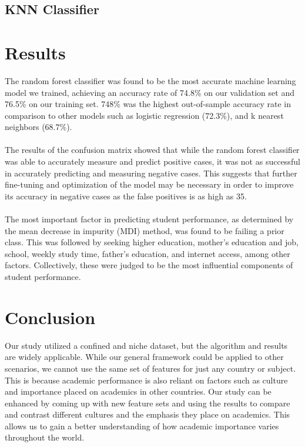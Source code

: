 \documentclass[twoside,twocolumn]{article}
\begin{document}
\subsection{KNN Classifier}

\section{Results}
The random forest classifier was found to be the most accurate machine learning model we trained, achieving an accuracy rate of 74.8\% on our validation set and 76.5\% on our training set. 748\% was the highest out-of-sample accuracy rate in comparison to other models such as logistic regression (72.3\%), and k nearest neighbors (68.7\%).
\\ \\
The results of the confusion matrix showed that while the random forest classifier was able to accurately measure and predict positive cases, it was not as successful in accurately predicting and measuring negative cases. This suggests that further fine-tuning and optimization of the model may be necessary in order to improve its accuracy in negative cases as the false positives is as high as 35.
\\ \\
The most important factor in predicting student performance, as determined by the mean decrease in impurity (MDI) method, was found to be failing a prior class. This was followed by seeking higher education, mother's education and job, school, weekly study time, father's education, and internet access, among other factors. Collectively, these were judged to be the most influential components of student performance.


\section{Conclusion}
Our study utilized a confined and niche dataset, but the algorithm and results are widely applicable. While our general framework could be applied to other scenarios, we cannot use the same set of features for just any country or subject. This is because academic performance is also reliant on factors such as culture and importance placed on academics in other countries. Our study can be enhanced by coming up with new feature sets and using the results to compare and contrast different cultures and the emphasis they place on academics. This allows us to gain a better understanding of how academic importance varies throughout the world.
\end{document}
